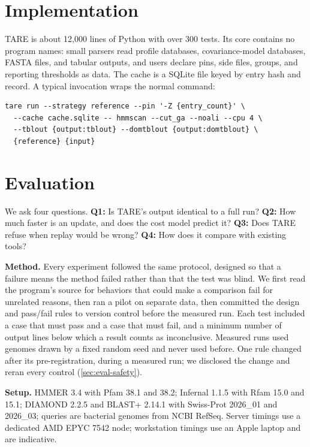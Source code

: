 \documentclass[letterpaper,twocolumn,10pt]{article}
\theoremstyle{definition}
\newcommand{\sys}{TARE\xspace}
\begin{document}
\section{Implementation}
\label{sec:impl}

\sys is about 12{,}000 lines of Python with over 300 tests. Its core contains no program names: small parsers read
profile databases, covariance-model databases, FASTA files, and tabular outputs, and users declare pins, side files,
groups, and reporting thresholds as data. The cache is a SQLite file keyed by entry hash and record. A typical
invocation wraps the normal command:
\begin{lstlisting}
tare run --strategy reference --pin '-Z {entry_count}' \
  --cache cache.sqlite -- hmmscan --cut_ga --noali --cpu 4 \
  --tblout {output:tblout} --domtblout {output:domtblout} \
  {reference} {input}
\end{lstlisting}

\section{Evaluation}
\label{sec:eval}

We ask four questions. \textbf{Q1:} Is \sys's output identical to a full run? \textbf{Q2:} How much faster is an
update, and does the cost model predict it? \textbf{Q3:} Does \sys refuse when replay would be wrong? \textbf{Q4:} How
does it compare with existing tools?

\textbf{Method.} Every experiment followed the same protocol, designed so that a failure means the method failed rather
than that the test was blind. We first read the program's source for behaviors that could make a comparison fail for
unrelated reasons, then ran a pilot on separate data, then committed the design and pass/fail rules to version control
before the measured run. Each test included a case that must pass and a case that must fail, and a minimum number of
output lines below which a result counts as inconclusive. Measured runs used genomes drawn by a fixed random seed and
never used before. One rule changed after its pre-registration, during a measured run; we disclosed the change and
reran every control (\cref{sec:eval-safety}).

\textbf{Setup.} HMMER 3.4 with Pfam 38.1 and 38.2; Infernal 1.1.5 with Rfam 15.0 and 15.1; DIAMOND 2.2.5 and BLAST+ 2.14.1
with Swiss-Prot 2026\_01 and 2026\_03; queries are bacterial genomes from NCBI RefSeq. Server timings use a dedicated
AMD EPYC 7542 node; workstation timings use an Apple laptop and are indicative.
\end{document}
